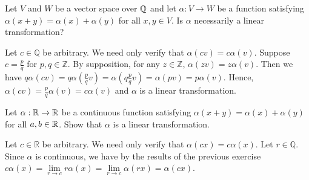 \probskip


\begin{ex}[Golan 239]
Let $V$ and $W$ be a vector space over $\mathbb{Q}$ and let 
$\alpha: V \rightarrow W$ be a function satisfying 
$\alpha(x+y) = \alpha(x) + \alpha(y)$ for all $x, y \in V$.
Is $\alpha$ necessarily a linear transformation?
\end{ex}
\smallskip
\begin{solution}
Let $c\in\mathbb{Q}$ be arbitrary. We need only verify that $\alpha(cv) = c\alpha(v)$. Suppose $c = \frac{p}{q}$ for $p,q\in\mathbb{Z}$.  By supposition, for any $z\in\mathbb{Z}$, $\alpha(zv) = z\alpha(v)$.  Then we have $q\alpha(cv) = q\alpha(\frac{p}{q}v) = \alpha(q\frac{p}{q}v) = \alpha(pv) = p\alpha(v)$.  Hence, $\alpha(cv) = \frac{p}{q}\alpha(v) = c\alpha(v)$ and $\alpha$ is a linear transformation.
\end{solution}

\probskip

\begin{ex}[Golan 240]
Let $\alpha: \mathbb{R} \rightarrow \mathbb{R}$ be a continuous function satisfying
$\alpha (x + y) = \alpha(x) + \alpha(y)$ for all $a, b \in \mathbb{R}$.  Show that
$\alpha$ is a linear transformation.
\end{ex}
\smallskip
\begin{solution}
Let $c\in\mathbb{R}$ be arbitrary. We need only verify that $\alpha(cx) = c\alpha(x)$.  Let $r\in\mathbb{Q}$.  Since $\alpha$ is continuous, we have by the results of the previous exercise $c\alpha(x) = \lim\limits_{r\to c}r\alpha(x) = \lim\limits_{r\to c}\alpha(rx) = \alpha(cx)$.  
\end{solution}

\probskip


